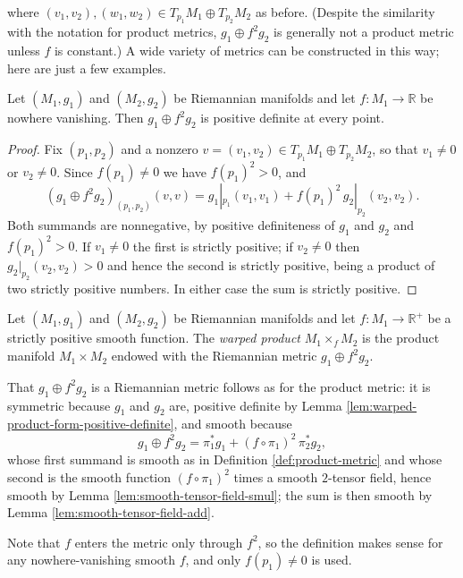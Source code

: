 where $(v_1, v_2), (w_1, w_2) \in T_{p_1}M_1 \oplus T_{p_2}M_2$ as before. (Despite the similarity with the notation for product metrics, $g_1 \oplus f^2 g_2$ is generally not a product metric unless $f$ is constant.) A wide variety of metrics can be constructed in this way; here are just a few examples.

\begin{lemma}
\label{lem:warped-product-form-positive-definite}
\leanok
{}
Let $(M_1,g_1)$ and $(M_2,g_2)$ be Riemannian manifolds and let $f : M_1 \to \mathbb{R}$ be nowhere vanishing. Then $g_1 \oplus f^2 g_2$ is positive definite at every point.
\end{lemma}

\begin{proof}
\leanok
{}
Fix $(p_1,p_2)$ and a nonzero $v = (v_1,v_2) \in T_{p_1}M_1 \oplus T_{p_2}M_2$, so that $v_1 \neq 0$ or $v_2 \neq 0$. Since $f(p_1) \neq 0$ we have $f(p_1)^2 > 0$, and
\[
(g_1 \oplus f^2 g_2)_{(p_1,p_2)}(v,v) = g_1|_{p_1}(v_1,v_1) + f(p_1)^2\, g_2|_{p_2}(v_2,v_2).
\]
Both summands are nonnegative, by positive definiteness of $g_1$ and $g_2$ and $f(p_1)^2 > 0$. If $v_1 \neq 0$ the first is strictly positive; if $v_2 \neq 0$ then $g_2|_{p_2}(v_2,v_2) > 0$ and hence the second is strictly positive, being a product of two strictly positive numbers. In either case the sum is strictly positive.
\end{proof}

\begin{definition}
\label{def:warped-product}
\leanok
{}
Let $(M_1,g_1)$ and $(M_2,g_2)$ be Riemannian manifolds and let $f : M_1 \to \mathbb{R}^+$ be a strictly positive smooth function. The \emph{warped product} $M_1 \times_f M_2$ is the product manifold $M_1 \times M_2$ endowed with the Riemannian metric $g_1 \oplus f^2 g_2$.

That $g_1 \oplus f^2 g_2$ is a Riemannian metric follows as for the product metric: it is symmetric because $g_1$ and $g_2$ are, positive definite by Lemma \ref{lem:warped-product-form-positive-definite}, and smooth because
\[
g_1 \oplus f^2 g_2 = \pi_1^* g_1 + (f \circ \pi_1)^2\, \pi_2^* g_2,
\]
whose first summand is smooth as in Definition \ref{def:product-metric} and whose second is the smooth function $(f \circ \pi_1)^2$ times a smooth $2$-tensor field, hence smooth by Lemma \ref{lem:smooth-tensor-field-smul}; the sum is then smooth by Lemma \ref{lem:smooth-tensor-field-add}.

Note that $f$ enters the metric only through $f^2$, so the definition makes sense for any nowhere-vanishing smooth $f$, and only $f(p_1) \neq 0$ is used.
\end{definition}

